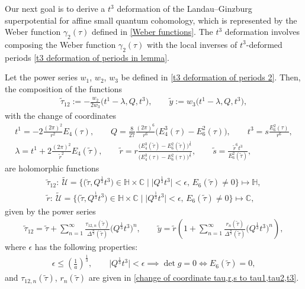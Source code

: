 Our next goal is to derive a $t^3$ deformation of the Landau--Ginzburg superpotential for affine small quantum cohomology, which is represented by the Weber function $\gamma_2(\tau)$ defined in \eqref{Weber functions}. The $t^3$ deformation involves composing the Weber function $\gamma_2(\tau)$ with the local inverses of $t^3$-deformed periods \eqref{t3 deformation of periods in lemma}.

\begin{Lemma}\label{lemma Milanov deformation 1 on LG superpotential}
Let the power series $w_1$, $w_2$, $w_3$ be defined in \eqref{t3 deformation of periods 2}.
Then, the composition of the functions
\begin{gather}
\tilde \tau_{12}:=-\frac{w_2}{2w_3}\bigl(t^1-\lambda,Q,t^3\bigr),\qquad
\tilde y:=w_3\bigl(t^1-\lambda,Q,t^3\bigr),\label{affine extended w2 w3 Big lemma}
\end{gather}
with the change of coordinates
\begin{gather}
t^1= -2\frac{(2\pi)^2}{r^2}E_4(\tau),\qquad Q= \frac{8}{27}\frac{(2\pi)^6}{r^6}\bigl(E_4^3(\tau)-E_6^2(\tau)\bigr),\qquad t^3= s\frac{E_6^2(\tau)}{r^6},\nonumber\\
\lambda= t^1+2\frac{(2\pi)^2}{\tilde r^2}E_4(\tilde\tau), \qquad \tilde r=r\frac{\bigl(E_4^3(\tilde\tau)-E_6^2(\tilde\tau)\bigr)^{\frac{1}{6}}}{\bigl(E_4^3(\tau)-E_6^2(\tau)\bigr)^{\frac{1}{6}}},\qquad \tilde s=\frac{\tilde r^6t^3}{E_6^2(\tilde\tau)},\label{change of extended coordinates flat intersection and auxiliary}
\end{gather}
are holomorphic functions
\begin{gather*}
\tilde\tau_{12}\colon \ \tilde{\mathcal{U}}=\bigl\{ \bigl(\tilde\tau,Q^{\frac{1}{3}}t^3\bigr)\in\mathbb{H}\times \mathbb{C}\mid \big|Q^{\frac{1}{3}}t^3\big|<\epsilon,\, E_6(\tilde\tau)\neq 0 \bigr\}\mapsto \mathbb{H},\\
\tilde r\colon \ \tilde{\mathcal{U}}=\bigl\{ \bigl(\tilde\tau,Q^{\frac{1}{3}}t^3\bigr)\in\mathbb{H}\times \mathbb{C}\mid \big|Q^{\frac{1}{3}}t^3\big|<\epsilon, \, E_6(\tilde\tau)\neq 0 \bigr\}\mapsto \mathbb{C},
\end{gather*}
given by the power series
\begin{gather}
\tilde\tau_{12}=\tilde\tau+\sum_{n=1}^{\infty}\frac{\tau_{12,n}(\tilde\tau)}{\Delta^{\frac{n}{3}}(\tilde\tau)} \bigl( Q^{\frac{1}{3}}t^3\bigr)^n,\qquad
\tilde y=\tilde r\left( 1+\sum_{n=1}^{\infty} \frac{r_n(\tilde\tau)}{\Delta^{\frac{n}{3}}(\tilde\tau)} \bigl(Q^{\frac{1}{3}} t^3 \bigr)^n \right),\label{affine in lambda t3 deformation of periods new coordinates z2 over z3 lemma}
\end{gather}
where $\epsilon$ has the following properties:
\begin{gather*}
\epsilon\leq \left(\frac{1}{a}\right)^{\frac{1}{3}} ,\qquad
\big|Q^{\frac{1}{3}}t^3\big|<\epsilon \implies \det g=0 \iff E_6(\tilde\tau)=0,
\end{gather*}
 and $\tau_{12,n}(\tilde\tau)$, $r_n(\tilde\tau)$ are given in \eqref{change of coordinate tau,r,s to tau1,tau2,t3}.


\end{Lemma}
